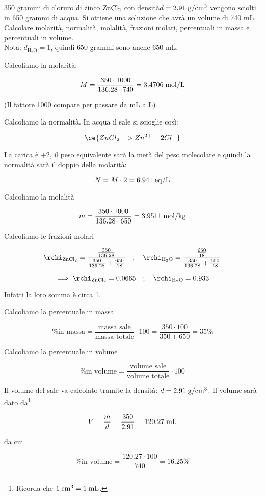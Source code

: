 \begin{esercizio}[$\bigstar$]
    350 grammi di cloruro di zinco $\rm ZnCl_2$ con densità\footnotemark\;$d=2.91 \; \rm g/cm^3$ vengono sciolti in 650 grammi di acqua. Si ottiene una soluzione che avrà un volume di 740 mL. Calcolare molarità, normalità, molalità, frazioni molari, percentuali in massa e percentuali in volume.\\[0.2cm]
    Nota: $d_{\text{H}_2\text{O}}=1$, quindi 650 grammi sono anche 650 mL.
\end{esercizio}
\begin{soluzione}
    Calcoliamo la molarità:

$$M=\frac{350 \cdot 1000}{136.28 \cdot 740}=3.4706 \; \rm mol/L$$

(Il fattore 1000 compare per passare da mL a L)

Calcoliamo la normalità. In acqua il sale si scioglie così:

$$\ce{ZnCl_2 -> Zn^{2+} + 2Cl^-}$$

La carica è +2, il peso equivalente sarà la metà del peso molecolare e quindi la normalità sarà il doppio della molarità:

$$N=M \cdot 2=6.941 \; \rm eq/L$$

Calcoliamo la molalità

$$m=\frac{350 \cdot 1000}{136.28 \cdot 650}=3.9511 \; \rm mol/kg$$

Calcoliamo le frazioni molari

$$\rchi_{\rm ZnCl_2}=\frac{\frac{350}{136.28}}{\frac{350}{136.28} + \frac{650}{18}}
\quad;\quad
\rchi_{\rm H_2O}=\frac{\frac{650}{18}}{\frac{350}{136.28} + \frac{650}{18}}$$

$$\implies
\rchi_{\rm ZnCl_2}=0.0665
\quad;\quad
\rchi_{\rm H_2O}=0.933
$$

Infatti la loro somma è circa 1.

Calcoliamo la percentuale in massa

$$\text{\% in massa}
=\frac{\text{massa sale}}{\text{massa totale}} \cdot 100
=\frac{350 \cdot 100}{350 + 650}=35\%$$

Calcoliamo la percentuale in volume

$$\text{\% in volume}
=\frac{\text{volume sale}}{\text{volume totale}} \cdot 100$$

Il volume del sale va calcolato tramite la densità: $d=2.91 \; \rm g/cm^3$. Il volume sarà dato da\footnote{Ricorda che $\rm 1 \; cm^3 = 1 \; mL$.}

$$V=\frac{m}{d}=\frac{350}{2.91}=120.27 \; \rm mL$$

da cui

$$\text{\% in volume}
=\frac{120.27 \cdot 100}{740}=16.25\%$$
\end{soluzione}

